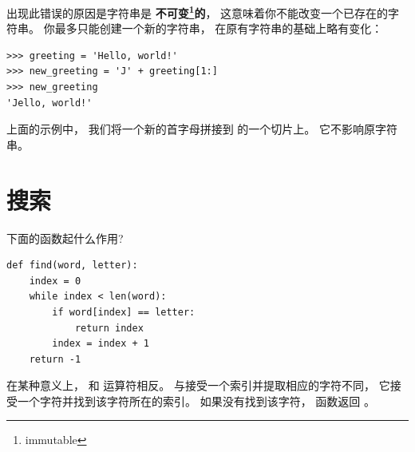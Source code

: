 
出现此错误的原因是字符串是 {\bf 不可变\footnote{immutable}的}， 这意味着你不能改变一个已存在的字符串。  你最多只能创建一个新的字符串， 在原有字符串的基础上略有变化：

\begin{lstlisting}
>>> greeting = 'Hello, world!'
>>> new_greeting = 'J' + greeting[1:]
>>> new_greeting
'Jello, world!'
\end{lstlisting}

%

上面的示例中， 我们将一个新的首字母拼接到  的一个切片上。  它不影响原字符串。


\section{搜索}
\label{find}

  

下面的函数起什么作用?

\begin{lstlisting}
def find(word, letter):
    index = 0
    while index < len(word):
        if word[index] == letter:
            return index
        index = index + 1
    return -1
\end{lstlisting}

%

在某种意义上，  和 \li{[]} 运算符相反。  与接受一个索引并提取相应的字符不同， 它接受一个字符并找到该字符所在的索引。  如果没有找到该字符， 函数返回 。



